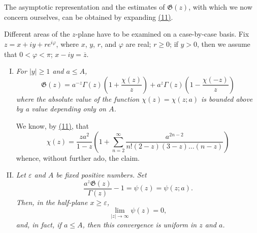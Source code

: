 \documentclass{article}
\theoremstyle{plain}
\newcommand{\GG}{\mathfrak{G}}
\renewcommand{\geq}{\geqslant}
\renewcommand{\leq}{\leqslant}
\newcommand{\oldpage}[1]{\marginpar{\footnotesize$\Big\vert$ \textit{p.~#1}}}
\begin{document}
\section{}
\label{section2}

The asymptotic representation and the estimates of $\GG(z)$, with which we now concern ourselves, can be obtained by expanding \hyperref[11]{(11)}.

\oldpage{309}
Different areas of the $z$-plane have to be examined on a case-by-case basis.
Fix $z = x+iy + re^{i\varphi}$, where $x$, $y$, $r$, and $\varphi$ are real; $r\geq0$; if $y>0$, then we assume that $0<\varphi<\pi$; $x-iy = \overline{z}$.

\begin{enumerate}[I.]
  \item \emph{For $|y|\geq1$ and $a\leq A$,}
    \[
    \label{17}
      \GG(z)
      = a^{-z} \Gamma(z) \left(
        1 + \frac{\chi(z)}{z}
      \right) + a^z \Gamma(z) \left(
        1 - \frac{\chi(-z)}{z}
      \right)
    \tag{17}
    \]
    \emph{where the absolute value of the function $\chi(z)=\chi(z;a)$ is bounded above by a value depending only on $A$.}
    \label{I}

    We know, by \hyperref[11]{(11)}, that
    \[
      \chi(z)
      = \frac{za^2}{1-z} \left(
        1 + \sum_{n=2}^\infty \frac{a^{2n-2}}{n!(2-z)(3-z)\ldots(n-z)}
      \right)
    \]
    whence, without further ado, the claim.
  \item \emph{Let $\varepsilon$ and $A$ be fixed positive numbers.}
    \emph{Set}
    \[
    \label{18}
      \frac{a^z\GG(z)}{\Gamma(z)} - 1
      = \psi(z) = \psi(z;a).
    \tag{18}
    \]
    \emph{Then, in the half-plane $x\geq\varepsilon$,}
    \[
    \label{19}
      \lim_{|z|\to\infty} \psi(z) = 0,
    \tag{19}
    \]
    \emph{and, in fact, if $a\leq A$, then this convergence is uniform in $z$ and $a$.}
    \label{II}


\end{enumerate}
\end{document}
